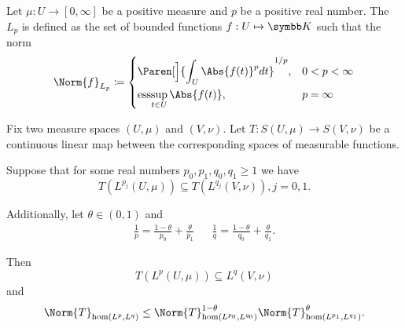 \begin{definition}\label{def:lebesgue_space}\cite[6]{Bergh1976}
  Let \( \mu: U \to [0, \infty] \) be a positive measure and \( p \) be a positive real number. The  \( L_p \) is defined as the set of bounded functions \( f: U \mapsto \BK \) such that the norm
  \begin{equation*}
    \Norm{f}_{L_p} \coloneqq \begin{dcases}
      \Paren[\Big]{\int_U \Abs{f(t)}^p dt}^{1/p}, &0 < p < \infty \\
      \Ess\sup_{t \in U} \Abs{f(t)} , &p = \infty
    \end{dcases}
  \end{equation*}
\end{definition}

\begin{theorem}\label{thm:riesz_thorin}
  Fix two measure spaces \( (U, \mu) \) and \( (V, \nu) \). Let \( T: S(U, \mu) \to S(V, \nu) \) be a continuous linear map between the corresponding spaces of measurable functions.

  Suppose that for some real numbers \( p_0, p_1, q_0, q_1 \geq 1 \) we have
  \begin{equation*}
    T(L^{p_j}(U, \mu)) \subseteq T(L^{q_j}(V, \nu)), j = 0, 1.
  \end{equation*}

  Additionally, let \( \theta \in (0, 1) \) and
  \begin{align*}
    \frac 1 p = \frac {1 - \theta} {p_0} + \frac {\theta} {p_1}
    &&
    \frac 1 q = \frac {1 - \theta} {q_0} + \frac {\theta} {q_1}.
  \end{align*}

  Then
  \begin{equation*}
    T(L^p(U, \mu)) \subseteq L^q(V, \nu)
  \end{equation*}
  and
  \begin{equation*}
    \Norm{T}_{\Hom(L^p, L^q)} \leq \Norm{T}_{\Hom(L^{p_0}, L^{q_0})}^{1 - \theta} \Norm{T}_{\Hom(L^{p_1}, L^{q_1})}^\theta.
  \end{equation*}
\end{theorem}

